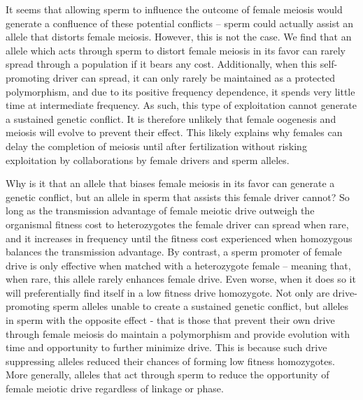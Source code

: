 \documentclass{pnastwo}
\begin{document}
\begin{article}
It seems that allowing sperm to influence the outcome of female meiosis would generate a confluence of these potential conflicts -- 
	sperm could actually assist an allele that distorts female meiosis.
However, this is not the case.
We find that an allele which acts through sperm to distort female meiosis in its favor 
	can rarely spread through a population if it bears any cost. 
Additionally, when this self-promoting driver can spread, it can only rarely 
	be maintained as a protected polymorphism, and due to its positive frequency dependence,  
	it spends very little time at intermediate frequency.
As such, this type of exploitation cannot generate a sustained genetic conflict.
It is therefore unlikely
	that female oogenesis and meiosis will evolve to prevent their effect.  
This likely explains why females can delay the completion of meiosis until after fertilization 
	without risking exploitation by collaborations by female
        drivers and sperm alleles.


Why is it that an allele that biases female meiosis in its favor can generate a genetic conflict, but an allele in sperm that assists this female driver cannot? 
So long as the transmission advantage of female meiotic drive outweigh the organismal fitness cost to heterozygotes the female driver can spread when rare, and it increases in 		
	frequency until the fitness cost experienced when homozygous balances the transmission advantage.
By contrast, a sperm promoter of female drive is only effective when matched with a heterozygote female -- meaning that, when rare, this allele rarely enhances female drive. 
Even worse, when it does so it will preferentially find itself in a low fitness drive homozygote. 
Not only are drive-promoting sperm alleles unable to create a sustained genetic conflict, 
	but alleles in sperm with the opposite effect - that is those that prevent their own drive through female meiosis do maintain a polymorphism and 
	provide evolution  with time and opportunity to further minimize drive.
This is because such drive suppressing alleles reduced their chances
of forming low fitness homozygotes. 
More generally, alleles that act through sperm to
 reduce the opportunity of female meiotic drive regardless of linkage or phase. 
 

\end{article}
\end{document}
